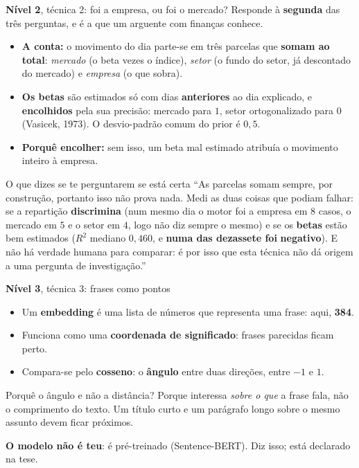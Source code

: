 \documentclass[aspectratio=169]{beamer}
\newcommand{\key}[1]{\textbf{\textcolor{blue!55!black}{#1}}}
\begin{document}
\begin{frame}{\key{Nível 2}, técnica 2: foi a empresa, ou foi o mercado?}
\small
Responde à \key{segunda} das três perguntas, e é a que um arguente com finanças conhece.
\vspace{2mm}
\begin{itemize}
  \item \key{A conta:} o movimento do dia parte-se em três parcelas que \textbf{somam ao}
        \textbf{total}: \emph{mercado} (o beta vezes o índice), \emph{setor} (o fundo do setor,
        já descontado do mercado) e \emph{empresa} (o que sobra).
  \item \key{Os betas} são estimados só com dias \textbf{anteriores} ao dia explicado, e
        \textbf{encolhidos} pela sua precisão: mercado para $1$, setor ortogonalizado para $0$
        (Vasicek, 1973). O desvio-padrão comum do prior é $0{,}5$.
  \item \key{Porquê encolher:} sem isso, um beta mal estimado atribuía o movimento inteiro à
        empresa.
\end{itemize}
\vspace{2mm}
\begin{block}{O que dizes se te perguntarem se está certa}
``As parcelas somam sempre, por construção, portanto isso não prova nada. Medi as duas coisas
que podiam falhar: se a repartição \textbf{discrimina} (num mesmo dia o motor foi a empresa em
$8$ casos, o mercado em $5$ e o setor em $4$, logo não diz sempre o mesmo) e se os
\textbf{betas} estão bem estimados ($R^2$ mediano $0{,}460$, e \textbf{numa das dezassete foi}
\textbf{negativo}). E não há verdade humana para comparar: é por isso que esta
técnica não dá origem a uma pergunta de investigação.''
\end{block}
\end{frame}

\begin{frame}{\key{Nível 3}, técnica 3: frases como pontos}
\begin{itemize}
  \item Um \key{embedding} é uma lista de números que representa uma frase: aqui, \textbf{384}.
  \item Funciona como uma \textbf{coordenada de significado}: frases parecidas ficam perto.
  \item Compara-se pelo \key{cosseno}: o \textbf{ângulo} entre duas direções, entre $-1$ e $1$.
\end{itemize}
\vspace{3mm}
\begin{block}{Porquê o ângulo e não a distância?}
Porque interessa \emph{sobre o que} a frase fala, não o comprimento do texto. Um título curto e
um parágrafo longo sobre o mesmo assunto devem ficar próximos.
\end{block}
\vspace{2mm}
\footnotesize
\key{O modelo não é teu}: é pré-treinado (Sentence-BERT). Diz isso; está declarado na tese.
\end{frame}
\end{document}
